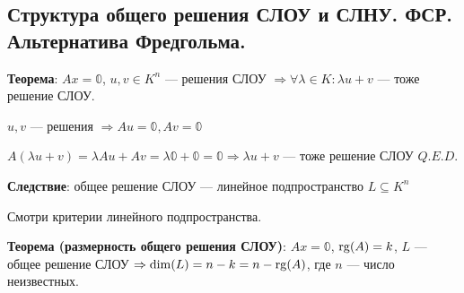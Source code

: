 \subsection{Структура общего решения СЛОУ и СЛНУ. ФСР. Альтернатива Фредгольма.}

\textbf{Теорема}: \(Ax = \mathbb{0}\), \(u,v \in K^n\) --- решения СЛОУ \(\Rightarrow \forall \lambda \in K: \lambda u + v\) --- тоже решение СЛОУ.

\prooff{} 
\(u, v\) --- решения \(\Rightarrow Au = \mathbb{0}, Av = \mathbb{0}\)

\(A(\lambda u + v) = \lambda Au + Av = \lambda \mathbb{0} + \mathbb{0} = \mathbb{0} \Rightarrow \lambda u + v\) --- тоже решение СЛОУ \(Q.E.D.\)

\textbf{Следствие}: общее решение СЛОУ --- линейное подпространство \(L \subseteq K^n\)

Смотри критерии линейного подпространства.

\textbf{Теорема (размерность общего  решения СЛОУ)}: \(Ax = \mathbb{0}\), \(\operatorname{rg}(A) = k\), \(L\) --- общее решение СЛОУ \(\Rightarrow \dim(L) = n - k = n - \operatorname{rg}(A)\), где \(n\) --- число неизвестных.

